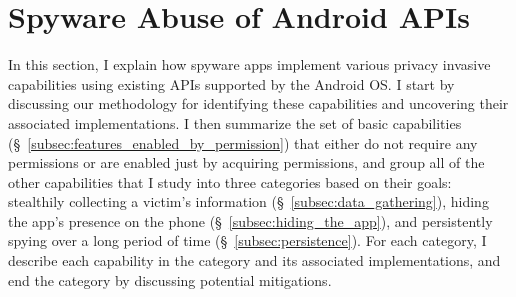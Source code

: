 \section{Spyware Abuse of Android APIs}
\label{sec:api-abuse}

In this section, I explain how spyware apps implement various privacy invasive
capabilities using existing APIs supported by the Android OS.
I start by discussing our methodology for identifying these capabilities and uncovering their associated implementations.
I then summarize the set of basic capabilities (\S~\ref{subsec:features_enabled_by_permission}) that either do not require any permissions or are enabled just by acquiring permissions,
and group
all of the other capabilities that I study into three categories based on their goals: stealthily
collecting a victim's information (\S~\ref{subsec:data_gathering}), hiding the app's presence on the phone (\S~\ref{subsec:hiding_the_app}), and persistently
spying over a long period of time (\S~\ref{subsec:persistence}).
For each category, I
describe
each capability in the category and its associated implementations, and end
the category by discussing potential mitigations.


